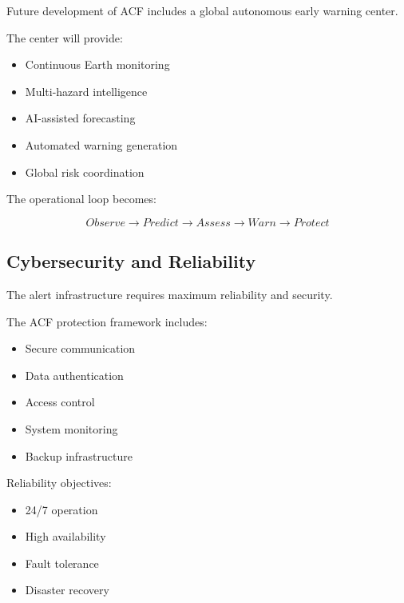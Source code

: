 Future development of ACF includes a global autonomous early warning
center.

The center will provide:

\begin{itemize}

\item Continuous Earth monitoring

\item Multi-hazard intelligence

\item AI-assisted forecasting

\item Automated warning generation

\item Global risk coordination

\end{itemize}


The operational loop becomes:

\[
Observe
\rightarrow
Predict
\rightarrow
Assess
\rightarrow
Warn
\rightarrow
Protect
\]



\subsection{Cybersecurity and Reliability}

The alert infrastructure requires maximum reliability and security.

The ACF protection framework includes:

\begin{itemize}

\item Secure communication

\item Data authentication

\item Access control

\item System monitoring

\item Backup infrastructure

\end{itemize}


Reliability objectives:

\begin{itemize}

\item 24/7 operation

\item High availability

\item Fault tolerance

\item Disaster recovery

\end{itemize}



